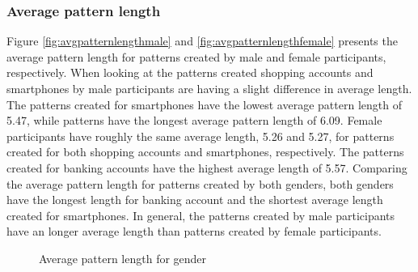     \clearpage
    \subsubsection{Average pattern length}
    Figure \ref{fig:avgpatternlengthmale} and \ref{fig:avgpatternlengthfemale} presents the average pattern length for patterns created by male and female participants, respectively. When looking at the patterns created shopping accounts and smartphones by male participants are having a slight difference in average length. The patterns created for smartphones have the lowest average pattern length of 5.47, while patterns have the longest average pattern length of 6.09. Female participants have roughly the same average length, 5.26 and 5.27, for patterns created for both shopping accounts and smartphones, respectively. The patterns created for banking accounts have the highest average length of 5.57. Comparing the average pattern length for patterns created by both genders, both genders have the longest length for banking account and the shortest average length created for smartphones. In general, the patterns created by male participants have an longer average length than patterns created by female participants. 

    \begin{figure}[H]
    	\centering
    	\caption{Average pattern length for gender}
    	\label{fig:avgpatternlengthgender}
    \end{figure}

